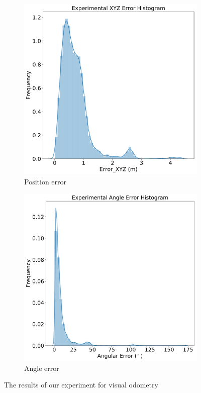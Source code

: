 \documentclass{article}
\begin{document}
\begin{figure}[H]
  \centering
  \begin{subfigure}[b]{0.45\textwidth}
    \includegraphics[width=\textwidth]{../figures/expxyz.pdf}
    \caption{Position error}
  \end{subfigure}
  \begin{subfigure}[b]{0.45\textwidth}
    \includegraphics[width=\textwidth]{../figures/expangle.pdf}
    \caption{Angle error}
  \end{subfigure}
  \caption{The results of our experiment for visual odometry}
\end{figure}
\end{document}
